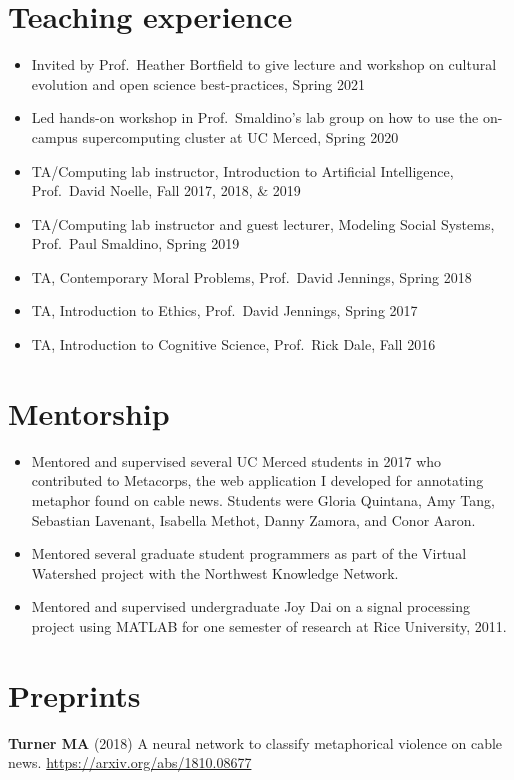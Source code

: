 \documentclass[letterpaper,11pt,oneside]{article}
\begin{document}
\noindent
\section*{\textcolor{gunmetal}{Teaching experience}}
\begin{itemize}
  \item Invited by Prof.\ Heather Bortfield to give lecture and workshop on cultural evolution and open science best-practices, Spring 2021
  \item Led hands-on workshop in Prof.\ Smaldino's lab group on how to use the on-campus supercomputing cluster at UC Merced, Spring 2020
  \item TA/Computing lab instructor, Introduction to Artificial Intelligence, Prof.\ David Noelle, Fall 2017, 2018, \& 2019
  \item TA/Computing lab instructor and guest lecturer, Modeling Social Systems, Prof.\ Paul Smaldino, Spring 2019
  \item TA, Contemporary Moral Problems, Prof.\ David Jennings, Spring 2018
  \item TA, Introduction to Ethics, Prof.\ David Jennings, Spring 2017
  \item TA, Introduction to Cognitive Science, Prof.\ Rick Dale, Fall 2016
\end{itemize}

\noindent
\section*{\textcolor{gunmetal}{Mentorship}}
\begin{itemize}
  \item Mentored and supervised several UC Merced students in 2017 
    who contributed to
    Metacorps, the web application I developed for annotating metaphor found
    on cable news. Students were Gloria Quintana, Amy Tang, Sebastian Lavenant, Isabella Methot,
    Danny Zamora, and Conor Aaron.
  \item
    Mentored several graduate student programmers as part of the Virtual Watershed
    project with the Northwest Knowledge Network.
  \item Mentored and supervised undergraduate Joy Dai on a signal processing project using MATLAB for
    one semester of research at Rice University, 2011.
\end{itemize}

\noindent
\section*{\textcolor{gunmetal}{Preprints}}
\begin{hangparas}{0.25in}{1}

  \textbf{Turner MA} (2018) A neural network to classify metaphorical violence on cable news. \url{https://arxiv.org/abs/1810.08677}

\end{hangparas}
\end{document}
